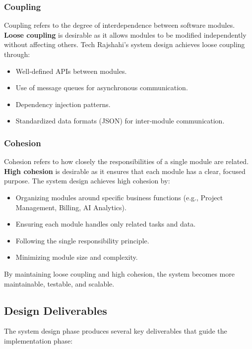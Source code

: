 \documentclass[12pt,a4paper]{article}
\begin{document}
\subsubsection{Coupling}
Coupling refers to the degree of interdependence between software modules.  \textbf{Loose coupling} is desirable as it allows modules to be modified independently without affecting others.  Tech Rajshahi's system design achieves loose coupling through:
\begin{itemize}
    \item Well‑defined APIs between modules.
    \item Use of message queues for asynchronous communication.
    \item Dependency injection patterns.
    \item Standardized data formats (JSON) for inter‑module communication.
\end{itemize}

\subsubsection{Cohesion}
Cohesion refers to how closely the responsibilities of a single module are related.  \textbf{High cohesion} is desirable as it ensures that each module has a clear, focused purpose.  The system design achieves high cohesion by:
\begin{itemize}
    \item Organizing modules around specific business functions (e.g., Project Management, Billing, AI Analytics).
    \item Ensuring each module handles only related tasks and data.
    \item Following the single responsibility principle.
    \item Minimizing module size and complexity.
\end{itemize}

By maintaining loose coupling and high cohesion, the system becomes more maintainable, testable, and scalable.

\subsection{Design Deliverables}
The system design phase produces several key deliverables that guide the implementation phase:
\end{document}
